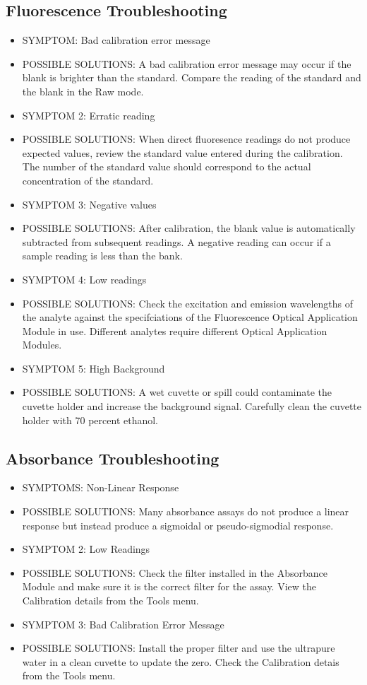 \documentclass[12pt]{../SOP3_beta}
\begin{document}
\subsection{Fluorescence Troubleshooting}
\begin{itemize}
  \item SYMPTOM: Bad calibration error message
  \item POSSIBLE SOLUTIONS: A bad calibration error message may occur if the blank is brighter than the standard. Compare the reading of the standard and the blank in the Raw mode. 
  \item SYMPTOM 2: Erratic reading
  \item POSSIBLE SOLUTIONS: When direct fluoresence readings do not produce expected values, review the standard value entered during the calibration. The number of the standard value should correspond to the actual concentration of the standard.
  \item SYMPTOM 3: Negative values
  \item POSSIBLE SOLUTIONS: After calibration, the blank value is automatically subtracted from subsequent readings. A negative reading can occur if a sample reading is less than the bank.
  \item SYMPTOM 4: Low readings
  \item POSSIBLE SOLUTIONS: Check the excitation and emission wavelengths of the analyte against the specifciations of the Fluorescence Optical Application Module in use. Different analytes require different Optical Application Modules.
  \item SYMPTOM 5: High Background
  \item POSSIBLE SOLUTIONS: A wet cuvette or spill could contaminate the cuvette holder and increase the background signal. Carefully clean the cuvette holder with 70 percent ethanol. 
\end{itemize}

\subsection{Absorbance Troubleshooting}
\begin{itemize}
  \item SYMPTOMS: Non-Linear Response
  \item POSSIBLE SOLUTIONS: Many absorbance assays do not produce a linear response but instead produce a sigmoidal or pseudo-sigmodial response. 
  \item SYMPTOM 2: Low Readings
  \item POSSIBLE SOLUTIONS: Check the filter installed in the Absorbance Module and make sure it is the correct filter for the assay. View the Calibration details from the Tools menu.
  \item SYMPTOM 3: Bad Calibration Error Message
  \item POSSIBLE SOLUTIONS: Install the proper filter and use the ultrapure water in a clean cuvette to update the zero. Check the Calibration detais from the Tools menu. 
\end{itemize}
\end{document}
